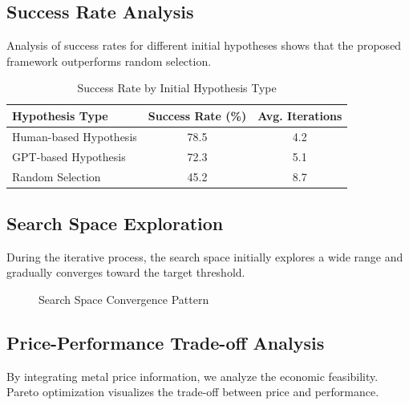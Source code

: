\subsection{Success Rate Analysis}

Analysis of success rates for different initial hypotheses shows that the proposed framework outperforms random selection.

\begin{table}[H]
    \centering
    \caption{Success Rate by Initial Hypothesis Type}
    \begin{tabular}{lcc}
    \toprule
         \textbf{Hypothesis Type} & \textbf{Success Rate (\%)} & \textbf{Avg. Iterations} \\
    \midrule
         Human-based Hypothesis & 78.5 & 4.2 \\
         GPT-based Hypothesis & 72.3 & 5.1 \\
         Random Selection & 45.2 & 8.7 \\
    \bottomrule
    \end{tabular} 
    \label{tab:success_rate}
\end{table}

\subsection{Search Space Exploration}

During the iterative process, the search space initially explores a wide range and gradually converges toward the target threshold.

\begin{figure}[H]
    \centering
    \caption{Search Space Convergence Pattern}
    \label{fig:search_convergence}
\end{figure}

\subsection{Price-Performance Trade-off Analysis}

By integrating metal price information, we analyze the economic feasibility. Pareto optimization visualizes the trade-off between price and performance.

